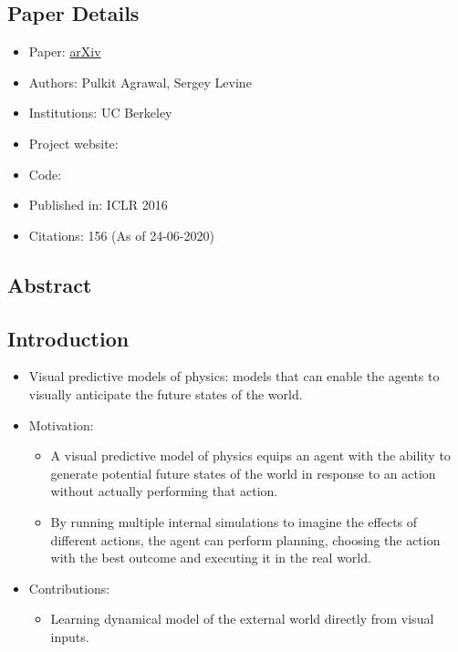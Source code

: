 \documentclass{article}
\begin{document}
    \subsection*{Paper Details}
    \begin{itemize}
        \item Paper: \href{https://arxiv.org/abs/1511.07404}{arXiv}
        \item Authors: Pulkit Agrawal, Sergey Levine
        \item Institutions: UC Berkeley
        \item Project website:
        \item Code:
        \item Published in: ICLR 2016
        \item Citations: 156 (As of 24-06-2020)
    \end{itemize}

    \subsection*{Abstract}

    \subsection{Introduction}\label{subsec:Learning_Visual_Predictive_Models_of_Physics_for_Playing_Billiards:introduction}
    \begin{itemize}
        \item Visual predictive models of physics: models that can enable the agents to visually anticipate the future states of the world.
        \item Motivation:
        \begin{itemize}
            \item A visual predictive model of physics equips an agent with the ability to generate potential future states of the world in response to an action without actually performing that action.
            \item By running multiple internal simulations to imagine the effects of different actions, the agent can perform planning, choosing the action with the best outcome and executing it in the real world.
        \end{itemize}
        \item Contributions:
        \begin{itemize}
            \item Learning dynamical model of the external world directly from visual inputs.
        \end{itemize}
    \end{itemize}
\end{document}
